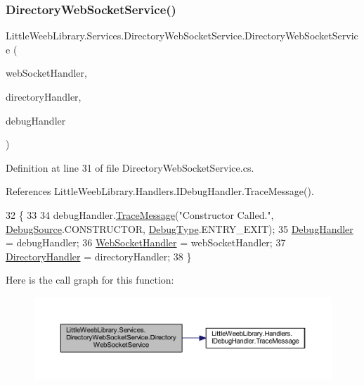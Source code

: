 \subsubsection{\texorpdfstring{Directory\+Web\+Socket\+Service()}{DirectoryWebSocketService()}}
{\footnotesize\ttfamily Little\+Weeb\+Library.\+Services.\+Directory\+Web\+Socket\+Service.\+Directory\+Web\+Socket\+Service (\begin{DoxyParamCaption}\item[{\mbox{\hyperlink{interface_little_weeb_library_1_1_handlers_1_1_i_web_socket_handler}{I\+Web\+Socket\+Handler}}}]{web\+Socket\+Handler,  }\item[{\mbox{\hyperlink{interface_little_weeb_library_1_1_handlers_1_1_i_directory_handler}{I\+Directory\+Handler}}}]{directory\+Handler,  }\item[{\mbox{\hyperlink{interface_little_weeb_library_1_1_handlers_1_1_i_debug_handler}{I\+Debug\+Handler}}}]{debug\+Handler }\end{DoxyParamCaption})}



Definition at line 31 of file Directory\+Web\+Socket\+Service.\+cs.



References Little\+Weeb\+Library.\+Handlers.\+I\+Debug\+Handler.\+Trace\+Message().


\begin{DoxyCode}
32         \{
33             
34             debugHandler.\mbox{\hyperlink{interface_little_weeb_library_1_1_handlers_1_1_i_debug_handler_a2e405bc3492e683cd3702fae125221bc}{TraceMessage}}(\textcolor{stringliteral}{"Constructor Called."}, 
      \mbox{\hyperlink{namespace_little_weeb_library_1_1_handlers_a2a6ca0775121c9c503d58aa254d292be}{DebugSource}}.CONSTRUCTOR, \mbox{\hyperlink{namespace_little_weeb_library_1_1_handlers_ab66019ed40462876ec4e61bb3ccb0a62}{DebugType}}.ENTRY\_EXIT);
35             \mbox{\hyperlink{class_little_weeb_library_1_1_handlers_1_1_debug_handler}{DebugHandler}} = debugHandler;
36             \mbox{\hyperlink{class_little_weeb_library_1_1_handlers_1_1_web_socket_handler}{WebSocketHandler}} = webSocketHandler;
37             \mbox{\hyperlink{class_little_weeb_library_1_1_handlers_1_1_directory_handler}{DirectoryHandler}} = directoryHandler;
38         \}
\end{DoxyCode}
Here is the call graph for this function\+:\nopagebreak
\begin{figure}[H]
\begin{center}
\leavevmode
\includegraphics[width=350pt]{class_little_weeb_library_1_1_services_1_1_directory_web_socket_service_ac0842064ce4231990ed07bcbacb7a71f_cgraph}
\end{center}
\end{figure}


